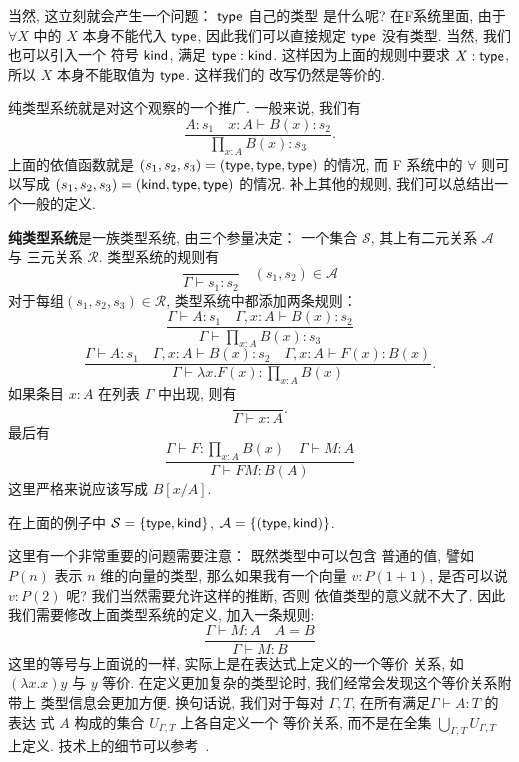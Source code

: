 当然, 这立刻就会产生一个问题： \(\textsf{type}\) 自己的类型
是什么呢? 在F系统里面, 由于 \(\forall X\) 中的 \(X\)
本身不能代入 \(\textsf{type}\), 因此我们可以直接规定
\(\textsf{type}\) 没有类型. 当然, 我们也可以引入一个
符号 \(\textsf{kind}\), 满足 \(\textsf{type} : \textsf{kind}\).
这样因为上面的规则中要求 \(X : \textsf{type}\),
所以 \(X\) 本身不能取值为 \(\textsf{type}\). 这样我们的
改写仍然是等价的.

纯类型系统就是对这个观察的一个推广. 一般来说, 我们有
\[\frac{A : s_1 \quad x{:}A \vdash B(x) : s_2}{\prod_{x:A}B(x) : s_3}.\]
上面的依值函数就是 \((s_1,s_2,s_3) = (\textsf{type}, \textsf{type}, \textsf{type})\)
的情况, 而 F 系统中的 \(\forall\) 则可以写成
\((s_1,s_2,s_3) = (\textsf{kind}, \textsf{type}, \textsf{type})\)
的情况. 补上其他的规则, 我们可以总结出一个一般的定义.
\begin{definition}
\textbf{纯类型系统}是一族类型系统, 由三个参量决定：
一个集合 \(\mathcal S\),
其上有二元关系 \(\mathcal A\) 与
三元关系 \(\mathcal R\). 类型系统的规则有
\[\frac{}{\Gamma\vdash s_1 : s_2} \quad (s_1, s_2) \in \mathcal A\]
对于每组\((s_1,s_2,s_3)\in \mathcal R\),
类型系统中都添加两条规则：
\[\frac{\Gamma \vdash A : s_1 \quad \Gamma, x{:}A \vdash B(x) : s_2}{\Gamma \vdash \prod_{x:A} B(x) : s_3}\]
\[\frac{\Gamma \vdash A : s_1 \quad \Gamma, x{:}A \vdash B(x) : s_2\quad
\Gamma, x{:}A \vdash F(x) : B(x)}
{\Gamma \vdash \lambda x. F(x) : \prod_{x:A}B(x)}.\]
如果条目 \(x : A\) 在列表 \(\Gamma\) 中出现, 则有
\[\frac{}{\Gamma \vdash x : A}.\]
最后有
\[\frac{\Gamma \vdash F : \prod_{x:A}B(x) \quad
\Gamma \vdash M : A}{\Gamma \vdash FM : B(A)}\]
这里严格来说应该写成 \(B[x/A]\).
\end{definition}
在上面的例子中 \(\mathcal S = \{\textsf{type}, \textsf{kind}\}\),
\(\mathcal A = \{(\textsf{type}, \textsf{kind})\}\).

这里有一个非常重要的问题需要注意： 既然类型中可以包含
普通的值, 譬如 \(P(n)\) 表示 \(n\) 维的向量的类型,
那么如果我有一个向量 \(v : P(1+1)\), 是否可以说
\(v : P(2)\) 呢? 我们当然需要允许这样的推断, 否则
依值类型的意义就不大了. 因此我们需要修改上面类型系统的定义,
加入一条规则:
\[\frac{\Gamma \vdash M : A \quad A = B}{\Gamma \vdash M : B}\]
这里的等号与上面说的一样, 实际上是在表达式上定义的一个等价
关系, 如 \((\lambda x. x)y\) 与 \(y\) 等价.
在定义更加复杂的类型论时, 我们经常会发现这个等价关系附带上
类型信息会更加方便. 换句话说, 我们对于每对 \(\Gamma, T\),
在所有满足\(\Gamma \vdash A : T\) 的表达
式 \(A\) 构成的集合 \(U_{\Gamma, T}\) 上各自定义一个
等价关系, 而不是在全集 \(\bigcup_{\Gamma, T} U_{\Gamma, T}\) 上定义.
技术上的细节可以参考~\cite{barendregt:1992:lambda}.

